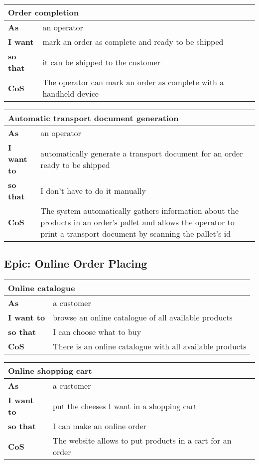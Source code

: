 \begin{tabularx}{\textwidth}{lX}
  \toprule
  \multicolumn{2}{l}{\textbf{Order completion}} \\
  \midrule
  \textbf{As} & an operator \\
  \textbf{I want} & mark an order as complete and ready to be shipped \\
  \textbf{so that} & it can be shipped to the customer \\
  \midrule
  \textbf{CoS} & The operator can mark an order as complete with a handheld device \\
  \bottomrule
\end{tabularx}

\begin{tabularx}{\textwidth}{lX}
  \toprule
  \multicolumn{2}{l}{\textbf{Automatic transport document generation}} \\
  \midrule
  \textbf{As} & an operator \\
  \textbf{I want to} & automatically generate a transport document for an order ready to be shipped \\
  \textbf{so that} & I don't have to do it manually \\
  \midrule
  \textbf{CoS} & The system automatically gathers information about the products in an order's pallet and allows the operator to print a transport document by scanning the pallet's id \\
  \bottomrule
\end{tabularx}

\subsection{Epic: Online Order Placing}
\begin{tabularx}{\textwidth}{lX}
  \toprule
  \multicolumn{2}{l}{\textbf{Online catalogue}} \\
  \midrule
  \textbf{As} & a customer \\
  \textbf{I want to} & browse an online catalogue of all available products \\
  \textbf{so that} & I can choose what to buy \\
  \midrule
  \textbf{CoS} & There is an online catalogue with all available products \\
  \bottomrule
\end{tabularx}

\begin{tabularx}{\textwidth}{lX}
  \toprule
  \multicolumn{2}{l}{\textbf{Online shopping cart}} \\
  \midrule
  \textbf{As} & a customer \\
  \textbf{I want to} & put the cheeses I want in a shopping cart \\
  \textbf{so that} & I can make an online order \\
  \midrule
  \textbf{CoS} & The website allows to put products in a cart for an order \\
  \bottomrule
\end{tabularx}

